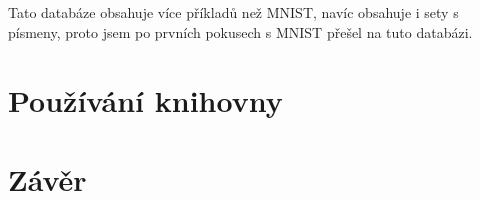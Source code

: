 \documentclass[12pt]{report}			%
\begin{document}
					Tato databáze obsahuje více příkladů než MNIST, navíc obsahuje i sety s písmeny, proto jsem po prvních pokusech s MNIST přešel na tuto databázi.

		\chapter{Používání knihovny}


	\appendix
	
	\chapter*{Závěr}
	
		\lipsum[1]
	
	\nocite{*}
    \printbibliography					%
    \printglossary[title={Slovníček pojmů}]	%
    \listoffigures						%
    \listoftables						%
    
    \begin{prilohy}
    \end{prilohy}
\end{document}
